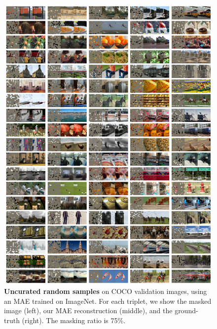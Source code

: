 \documentclass[10pt,twocolumn,letterpaper]{article}
\begin{document}
\begin{figure}[t]\centering\vspace{-3em}
\includegraphics[width=1\linewidth]{fig/samples_uncurated_coco}\vspace{-1em}
\caption{\textbf{Uncurated random samples} on COCO validation images, using an MAE trained on ImageNet. For each triplet, we show the masked image (left), our MAE reconstruction (middle), and the ground-truth (right). The masking ratio is 75\%.}
\label{fig:samples_uncurated_coco}
\end{figure}
\vfill
\end{document}

